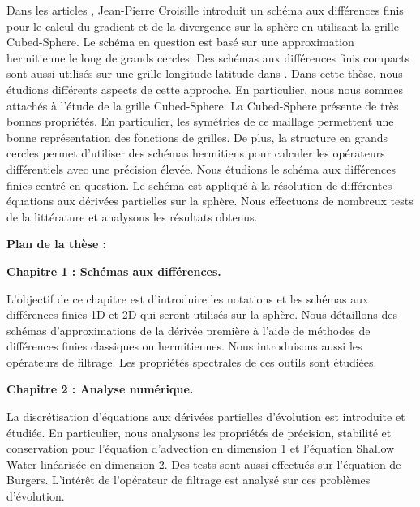 Dans les articles \cite{Croisille2015,Croisille2013}, Jean-Pierre Croisille introduit un schéma aux différences finis pour le calcul du gradient et de la divergence sur la sphère en utilisant la grille Cubed-Sphere. Le schéma en question est basé sur une approximation hermitienne le long de grands cercles. Des schémas aux différences finis compacts sont aussi utilisés sur une grille longitude-latitude dans \cite{Ghader2015}. Dans cette thèse, nous étudions différents aspects de cette approche. En particulier, nous nous sommes attachés à l'étude de la grille Cubed-Sphere. La Cubed-Sphere présente de très bonnes propriétés. En particulier, les symétries de ce maillage permettent une bonne représentation des fonctions de grilles. De plus, la structure en grands cercles permet d'utiliser des schémas hermitiens pour calculer les opérateurs différentiels avec une précision élevée. Nous étudions le schéma aux différences finies centré en question. Le schéma est appliqué à la résolution de différentes équations aux dérivées partielles sur la sphère. Nous effectuons de nombreux tests de la littérature et analysons les résultats obtenus.




\vspace{1.3cm}
\textbf{Plan de la thèse :}

\textbf{Chapitre 1 : Schémas aux différences.}

L'objectif de ce chapitre est d'introduire les notations et les schémas aux différences finies 1D et 2D qui seront utilisés sur la sphère. Nous détaillons des schémas d'approximations de la dérivée première à l'aide de méthodes de différences finies classiques ou hermitiennes. Nous introduisons aussi les opérateurs de filtrage. Les propriétés spectrales de ces outils sont étudiées.







\vspace{0.7cm}
\textbf{Chapitre 2 : Analyse numérique.}

La discrétisation d'équations aux dérivées partielles d'évolution est introduite et étudiée. En particulier, nous analysons les propriétés de précision, stabilité et conservation pour l'équation d'advection en dimension 1 et l'équation Shallow Water linéarisée en dimension 2. Des tests sont aussi effectués sur l'équation de Burgers. L'intérêt de l'opérateur de filtrage est analysé sur ces problèmes d'évolution.







